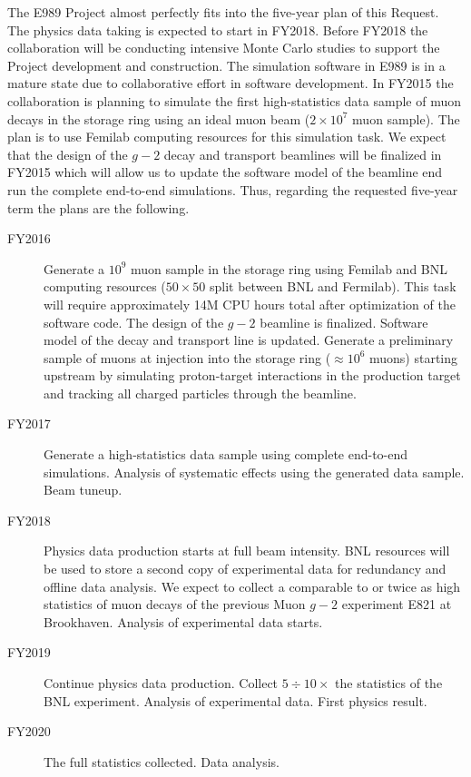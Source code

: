 \documentclass[pdftex,12pt,letter]{article}
\begin{document}
The E989 Project almost perfectly fits into the five-year plan of this
Request. 
The physics data taking is expected to start in FY2018. 
Before FY2018 the collaboration will be conducting intensive Monte
Carlo studies to support the Project development and construction. 
The simulation software in E989 is in a mature state due to
collaborative effort in software development. 
In FY2015 the collaboration is planning to simulate the first
high-statistics data sample of muon decays in the storage ring using
an ideal muon beam ($2\times 10^7$ muon sample). 
The plan is to use Femilab computing resources for this simulation
task. 
We expect that the design of the $g-2$ decay and transport beamlines
will be finalized in FY2015 which will allow us to update the software
model of the beamline end run the complete end-to-end simulations. 
Thus, regarding the requested five-year term the plans are the
following. 
\begin{description}
\item[FY2016] 
Generate a $10^9$ muon sample in the storage ring using Femilab and BNL computing resources ($50\times50$ split between BNL and Fermilab).  
  This task will require approximately 14M CPU hours total after optimization of the software code. 
  The design of the $g-2$ beamline is finalized.  
  Software model of the decay and transport line is updated. 
  Generate a preliminary sample of muons at injection into the storage ring ($\approx 10^6$ muons)  starting upstream by simulating proton-target interactions in the production target and tracking all charged particles through the beamline. 
\item[FY2017] 
  Generate a high-statistics data sample using complete end-to-end simulations. 
  Analysis of systematic effects using the generated data sample. 
  Beam tuneup. 
\item[FY2018] 
  Physics data production starts at full beam intensity. 
  BNL resources will be used to store a second copy of experimental data for redundancy and offline data analysis. 
  We expect to collect a comparable to or twice as high statistics of muon decays of the previous Muon $g-2$ experiment E821 at Brookhaven. 
  Analysis of experimental data starts. 
\item[FY2019] 
  Continue physics data production. 
  Collect $5\div 10\times$ the statistics of the BNL experiment. 
  Analysis of experimental data.  
  First physics result. 
\item[FY2020]
  The full statistics collected. Data analysis.  
\end{description}
\end{document}
